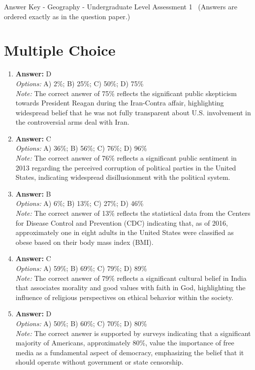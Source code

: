 \documentclass[12pt]{article}
\begin{document}
\begin{center}
Answer Key - Geography - Undergraduate Level Assessment 1 \
\small (Answers are ordered exactly as in the question paper.)
\end{center}

\section*{Multiple Choice}
\begin{enumerate}[label=\arabic*.]
\item \textbf{Answer:} D
\\ \textit{Options:} A) 2\%; B) 25\%; C) 50\%; D) 75\%
\\ \textit{Note:} The correct answer of 75\% reflects the significant public skepticism towards President Reagan during the Iran-Contra affair, highlighting widespread belief that he was not fully transparent about U.S. involvement in the controversial arms deal with Iran.
\item \textbf{Answer:} C
\\ \textit{Options:} A) 36\%; B) 56\%; C) 76\%; D) 96\%
\\ \textit{Note:} The correct answer of 76\% reflects a significant public sentiment in 2013 regarding the perceived corruption of political parties in the United States, indicating widespread disillusionment with the political system.
\item \textbf{Answer:} B
\\ \textit{Options:} A) 6\%; B) 13\%; C) 27\%; D) 46\%
\\ \textit{Note:} The correct answer of 13\% reflects the statistical data from the Centers for Disease Control and Prevention (CDC) indicating that, as of 2016, approximately one in eight adults in the United States were classified as obese based on their body mass index (BMI).
\item \textbf{Answer:} C
\\ \textit{Options:} A) 59\%; B) 69\%; C) 79\%; D) 89\%
\\ \textit{Note:} The correct answer of 79\% reflects a significant cultural belief in India that associates morality and good values with faith in God, highlighting the influence of religious perspectives on ethical behavior within the society.
\item \textbf{Answer:} D
\\ \textit{Options:} A) 50\%; B) 60\%; C) 70\%; D) 80\%
\\ \textit{Note:} The correct answer is supported by surveys indicating that a significant majority of Americans, approximately 80\%, value the importance of free media as a fundamental aspect of democracy, emphasizing the belief that it should operate without government or state censorship.
\end{enumerate}
\end{document}

